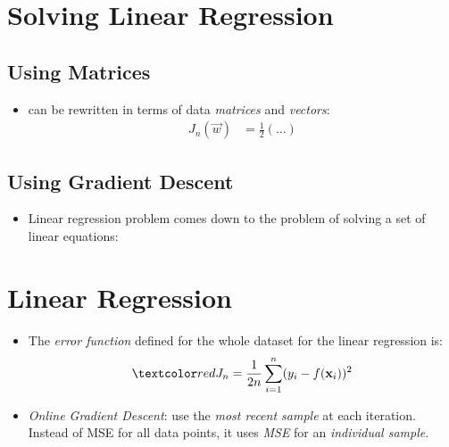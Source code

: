 \documentclass[
	number={5},
	title={Linear Regression}
]{cs584notes}
\begin{document}
\section{Solving Linear Regression}\label{sec:solving-linear-regression}
\subsection{Using Matrices}\label{subsec:using-matrices}
\begin{itemize}
	\item {} can be rewritten in terms of data \emph{matrices}  and \emph{vectors}:
	\begin{equation*}
	\begin{aligned}
		J_{n}(\vec{w}) &= \frac{1}{2}(\dots)
	\end{aligned}
	\end{equation*}
\end{itemize}

\subsection{Using Gradient Descent}\label{subsec:using-gradient-descent}
\begin{itemize}
	\item Linear regression problem comes down to the problem of solving a set of linear equations:
\end{itemize}

\section{Linear Regression}\label{sec:linear-regression}
\begin{itemize}
	\item The \emph{error function} defined for the whole dataset for the linear regression is:
	\[ \data{ J_{n} = \frac{1}{2n}\sum_{i=1}^{n} (y_{i} - f(\vec{x}_{i}))^{2} } \]
	\item \emph{Online Gradient Descent}: use the \emph{most recent sample} at each iteration.
	Instead of MSE for all data points, it uses \emph{MSE} for an \emph{individual sample}.
\end{itemize}
\end{document}
